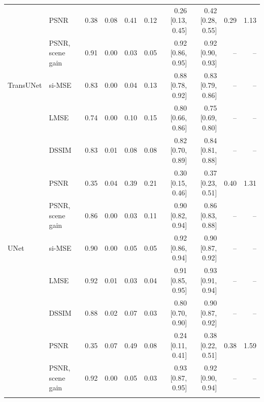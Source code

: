 \begin{table}[!t]
{\begin{tabular}{llrrrrrrrr}
 & PSNR & 0.38 & 0.08 & 0.41 & 0.12 & 0.26 [0.13, 0.45] & 0.42 [0.28, 0.55] & 0.29 & 1.13 \\
 & PSNR, scene gain & 0.91 & 0.00 & 0.03 & 0.05 & 0.92 [0.86, 0.95] & 0.92 [0.90, 0.93] & -- & -- \\
\addlinespace
TransUNet & si-MSE & 0.83 & 0.00 & 0.04 & 0.13 & 0.88 [0.78, 0.92] & 0.83 [0.79, 0.86] & -- & -- \\
 & LMSE & 0.74 & 0.00 & 0.10 & 0.15 & 0.80 [0.66, 0.86] & 0.75 [0.69, 0.80] & -- & -- \\
 & DSSIM & 0.83 & 0.01 & 0.08 & 0.08 & 0.82 [0.70, 0.89] & 0.84 [0.81, 0.88] & -- & -- \\
 & PSNR & 0.35 & 0.04 & 0.39 & 0.21 & 0.30 [0.15, 0.46] & 0.37 [0.23, 0.51] & 0.40 & 1.31 \\
 & PSNR, scene gain & 0.86 & 0.00 & 0.03 & 0.11 & 0.90 [0.82, 0.94] & 0.86 [0.83, 0.88] & -- & -- \\
\addlinespace
UNet & si-MSE & 0.90 & 0.00 & 0.05 & 0.05 & 0.92 [0.86, 0.94] & 0.90 [0.87, 0.92] & -- & -- \\
 & LMSE & 0.92 & 0.01 & 0.03 & 0.04 & 0.91 [0.85, 0.95] & 0.93 [0.91, 0.94] & -- & -- \\
 & DSSIM & 0.88 & 0.02 & 0.07 & 0.03 & 0.80 [0.70, 0.90] & 0.90 [0.87, 0.92] & -- & -- \\
 & PSNR & 0.35 & 0.07 & 0.49 & 0.08 & 0.24 [0.11, 0.41] & 0.38 [0.22, 0.51] & 0.38 & 1.59 \\
 & PSNR, scene gain & 0.92 & 0.00 & 0.05 & 0.03 & 0.93 [0.87, 0.95] & 0.92 [0.90, 0.94] & -- & -- \\
\addlinespace
\bottomrule\end{tabular}}\end{table}
